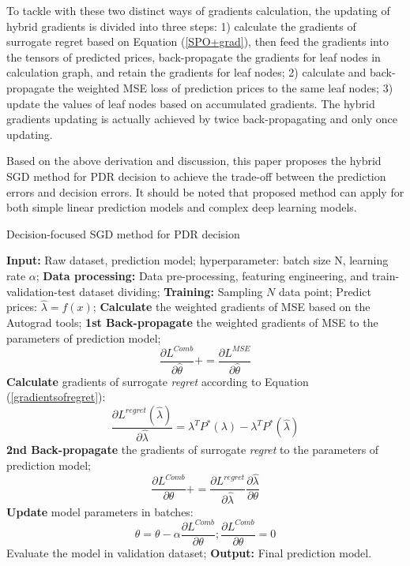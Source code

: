 \documentclass[journal]{IEEEtran}
\begin{document}
To tackle with these two distinct ways of gradients calculation, the updating of hybrid gradients is divided into three steps: 1) calculate the gradients of surrogate regret based on Equation (\ref{SPO+grad}), then feed the gradients into the tensors of predicted prices, back-propagate the gradients for leaf nodes in calculation graph, and retain the gradients for leaf nodes; 2) calculate and back-propagate the weighted MSE loss of prediction prices to the same leaf nodes; 3) update the values of leaf nodes based on accumulated gradients. The hybrid gradients updating is actually achieved by twice back-propagating and only once updating.

Based on the above derivation and discussion, this paper proposes the hybrid SGD method for PDR decision to achieve the trade-off between the prediction errors and decision errors. It should be noted that proposed method can apply for both simple linear prediction models and complex deep learning models.

\begin{algorithm}[!t]
  \label{CombSGD}
  \caption{Decision-focused SGD method for PDR decision}
  {\small{
    \begin{algorithmic}[1]
      \STATE \textbf{Input:} Raw dataset, prediction model; hyperparameter: batch size N, learning rate $\alpha$;
      \STATE \textbf{Data processing:} Data pre-processing, featuring engineering, and train-validation-test dataset dividing; 
      \STATE \textbf{Training:}
      \STATE Sampling $N$ data point; 
      \STATE Predict prices: $\hat{\lambda} = f(x)$;
      \STATE \textbf{Calculate} the weighted gradients of MSE based on the Autograd tools;
      \STATE \textbf{1st Back-propagate} the weighted gradients of MSE to the parameters of prediction model; $$\frac{\partial L^{Comb}}{\partial \hat{\theta}} += \frac{\partial L^{MSE}}{\partial \hat{\theta}}$$
      \STATE \textbf{Calculate} gradients of surrogate \textit{regret} according to Equation (\ref{gradientsofregret}): $$\frac{\partial L^{regret}(\hat{\lambda}) }{\partial \hat{\lambda}} =  \lambda^T P^*(\lambda) - \lambda^T P^*(\hat{\lambda})$$
      \STATE \textbf{2nd Back-propagate} the gradients of surrogate \textit{regret} to the parameters of prediction model;$$\frac{\partial L^{Comb}}{\partial \theta} += \frac{\partial L^{regret}}{\partial \hat{\lambda}} \frac{\partial \hat{\lambda}}{\partial \theta}$$
      \ENDFOR
      \STATE \textbf{Update} model parameters in batches: $$\theta = \theta - \alpha \frac{\partial L^{Comb}}{\partial \theta}; \frac{\partial L^{Comb}}{\partial \theta} = 0$$
      \STATE Evaluate the model in validation dataset;
      \ENDWHILE 
      \STATE \textbf{Output:} Final prediction model.
    \end{algorithmic}
  }}
\end{algorithm}
\end{document}
